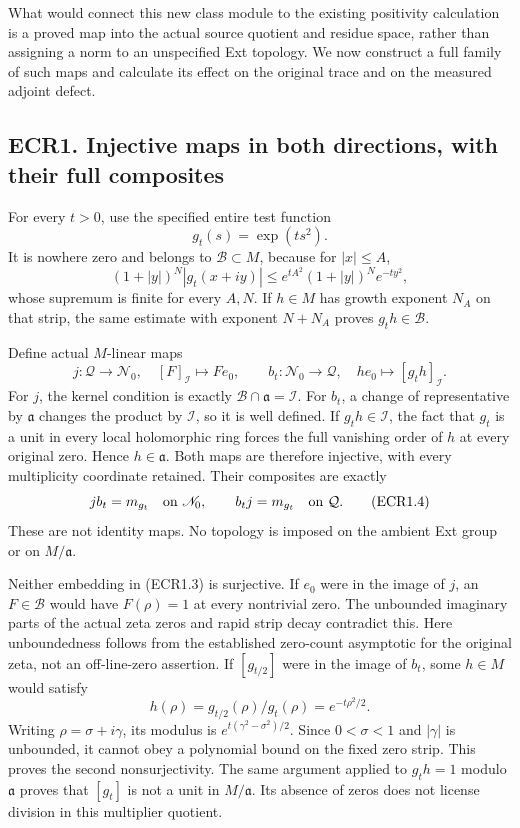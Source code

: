 What would connect this new class module to the existing positivity
calculation is a proved map into the actual source quotient and residue
space, rather than assigning a norm to an unspecified Ext topology. We
now construct a full family of such maps and calculate its effect on the
original trace and on the measured adjoint defect.

\subsection{ECR1. Injective maps in both directions, with their full
composites}\label{ecr1.-injective-maps-in-both-directions-with-their-full-composites}

For every \(t>0\), use the specified entire test function \[
g_t(s)=\exp(t s^2).
\tag{ECR1.1}
\] It is nowhere zero and belongs to \(\mathcal B\subset M\), because
for \(|x|\le A\), \[
(1+|y|)^N|g_t(x+iy)|
\le e^{tA^2}(1+|y|)^N e^{-ty^2},
\tag{ECR1.2}
\] whose supremum is finite for every \(A,N\). If \(h\in M\) has growth
exponent \(N_A\) on that strip, the same estimate with exponent
\(N+N_A\) proves \(g_th\in\mathcal B\).

Define actual \(M\)-linear maps \[
j:\mathcal Q\longrightarrow\mathscr N_0,
\quad [F]_{\mathcal I}\longmapsto F e_0,
\qquad
b_t:\mathscr N_0\longrightarrow\mathcal Q,
\quad h e_0\longmapsto[g_t h]_{\mathcal I}.
\tag{ECR1.3}
\] For \(j\), the kernel condition is exactly
\(\mathcal B\cap\mathfrak a=\mathcal I\). For \(b_t\), a change of
representative by \(\mathfrak a\) changes the product by \(\mathcal I\),
so it is well defined. If \(g_t h\in\mathcal I\), the fact that \(g_t\)
is a unit in every local holomorphic ring forces the full vanishing
order of \(h\) at every original zero. Hence \(h\in\mathfrak a\). Both
maps are therefore injective, with every multiplicity coordinate
retained. Their composites are exactly \[
j b_t=m_{g_t}\quad\hbox{on }\mathscr N_0,
\qquad b_t j=m_{g_t}\quad\hbox{on }\mathcal Q.
\tag{ECR1.4}
\] These are not identity maps. No topology is imposed on the ambient
Ext group or on \(M/\mathfrak a\).

Neither embedding in (ECR1.3) is surjective. If \(e_0\) were in the
image of \(j\), an \(F\in\mathcal B\) would have \(F(\rho)=1\) at every
nontrivial zero. The unbounded imaginary parts of the actual zeta zeros
and rapid strip decay contradict this. Here unboundedness follows from
the established zero-count asymptotic for the original zeta, not an
off-line-zero assertion. If \([g_{t/2}]\) were in the image of \(b_t\),
some \(h\in M\) would satisfy \[
h(\rho)=g_{t/2}(\rho)/g_t(\rho)=e^{-t\rho^2/2}.
\tag{ECR1.5}
\] Writing \(\rho=\sigma+i\gamma\), its modulus is
\(e^{t(\gamma^2-\sigma^2)/2}\). Since \(0<\sigma<1\) and \(|\gamma|\) is
unbounded, it cannot obey a polynomial bound on the fixed zero strip.
This proves the second nonsurjectivity. The same argument applied to
\(g_t h=1\) modulo \(\mathfrak a\) proves that \([g_t]\) is not a unit
in \(M/\mathfrak a\). Its absence of zeros does not license division in
this multiplier quotient.

